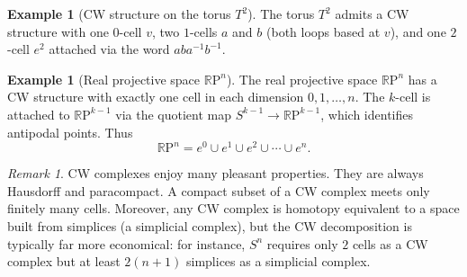 \documentclass[12pt,a4paper,openany]{book}
\theoremstyle{definition}
\newtheorem{example}[definition]{Example}
\theoremstyle{plain}
\theoremstyle{remark}
\newtheorem{remark}[definition]{Remark}
\newcommand{\RP}{\mathbb{R}\mathrm{P}}
\begin{document}
\begin{example}[CW structure on the torus $T^2$]\label{ex:CW-torus}
The torus $T^2$ admits a CW structure with one $0$-cell $v$, two $1$-cells $a$
and $b$ (both loops based at $v$), and one $2$-cell $e^2$ attached via the word
$aba^{-1}b^{-1}$.
\end{example}

\begin{center}
\label{fig:CW-torus}
\end{center}

\begin{example}[Real projective space $\RP^n$]\label{ex:CW-RPn}
The real projective space $\RP^n$ has a CW structure with exactly one cell in
each dimension $0, 1, \ldots, n$. The $k$-cell is attached to $\RP^{k-1}$ via
the quotient map $S^{k-1} \to \RP^{k-1}$, which identifies antipodal points.
Thus
\[
  \RP^n = e^0 \cup e^1 \cup e^2 \cup \cdots \cup e^n.
\]
\end{example}

\begin{remark}\label{rem:CW-advantages}
CW complexes enjoy many pleasant properties. They are always Hausdorff and
paracompact. A compact subset of a CW complex meets only finitely many cells.
Moreover, any CW complex is homotopy equivalent to a space built from simplices
(a simplicial complex), but the CW decomposition is typically far more
economical: for instance, $S^n$ requires only $2$ cells as a CW complex but at
least $2(n+1)$ simplices as a simplicial complex.
\end{remark}
\end{document}
